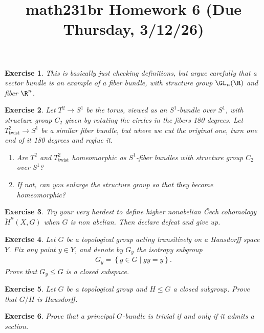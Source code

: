 \documentclass[11pt]{amsart}
\title{math231br Homework 6 (Due Thursday, 3/12/26)}
\newtheorem{hwexercise}{Exercise}
\begin{document}
\maketitle


\begin{hwexercise} This is basically just checking definitions, but argue carefully that a vector bundle is an example of a fiber bundle, with structure group $\GL_n(\R)$ and fiber $\R^n$.
\end{hwexercise}

\begin{hwexercise} Let $T^2 \to S^1$ be the torus, viewed as an $S^1$-bundle over $S^1$, with structure group $C_2$ given by rotating the circles in the fibers 180 degrees. Let $T^2_\text{twist} \to S^1$ be a similar fiber bundle, but where we cut the original one, turn one end of it 180 degrees and reglue it.
\begin{enumerate}
    \item Are $T^2$ and $T^2_\text{twist}$ homeomorphic as $S^1$-fiber bundles with structure group $C_2$ over $S^1$?
    \item If not, can you enlarge the structure group so that they become homeomorphic?
\end{enumerate}
\end{hwexercise}

\begin{hwexercise} Try your very hardest to define higher nonabelian \v{C}ech cohomology $\check{H}^n(X,G)$ when $G$ is non abelian. Then declare defeat and give up.
\end{hwexercise}

\begin{hwexercise} Let $G$ be a topological group acting transitively on a Hausdorff space $Y$. Fix any point $y\in Y$, and denote by $G_y$ the isotropy subgroup
\begin{align*}
    G_y = \left\{ g\in G \mid gy =y \right\}.
\end{align*}
Prove that $G_y \le G$ is a closed subspace.
\end{hwexercise}

\begin{hwexercise} Let $G$ be a topological group and $H \le G$ a closed subgroup. Prove that $G/H$ is Hausdorff.
\end{hwexercise}

\begin{hwexercise} Prove that a principal $G$-bundle is trivial if and only if it admits a section.
\end{hwexercise}
\end{document}
